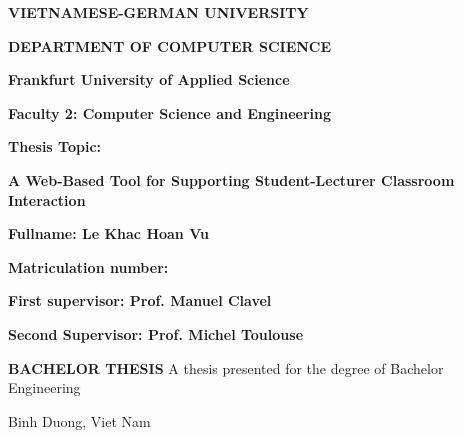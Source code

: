\documentclass[a4paper, 11pt,openany]{book} %
\begin{document}
 
\begin{titlepage} %
    \vspace*{2cm}
   \begin{center} \Large{
        \textbf{VIETNAMESE-GERMAN UNIVERSITY}
        
        \textbf{DEPARTMENT OF COMPUTER SCIENCE}
        
        \vspace{0.5cm}
 
       \textbf{Frankfurt University of Applied Science}
       
       \textbf{Faculty 2: Computer Science and Engineering}
       
 
       \vspace{0.5cm}
        \textbf{Thesis Topic:}
        
        \textbf{A Web-Based Tool for Supporting Student-Lecturer Classroom Interaction}
 
       \vspace{1cm}
 
       \textbf{Fullname: Le Khac Hoan Vu}
       
       \textbf{Matriculation number: }
       
       \vspace{1cm}
       \textbf{First supervisor: Prof. Manuel Clavel}
       
       \textbf{Second Supervisor: Prof. Michel Toulouse}
       
      \vspace{1cm}
      \textbf{BACHELOR THESIS}
        \vfill
       A thesis presented for the degree of Bachelor Engineering
 
       \vspace{0.8cm}
 
       Binh Duong, Viet Nam
    }
   \end{center}
   
   \clearpage
   \thispagestyle{empty}
   
	\raggedright %
	
	\vspace*{\baselineskip} %
	

\end{titlepage}
\end{document}
